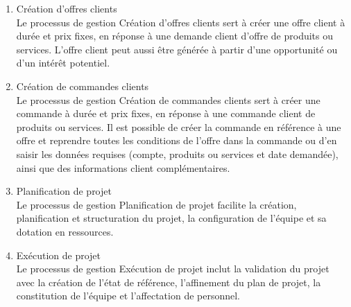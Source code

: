 \begin{enumerate}
\item Création d’offres clients \\
Le processus de gestion Création d'offres clients sert à créer une offre  client à durée et prix fixes, en réponse à une demande client d'offre de  produits ou services. L'offre client peut aussi être générée à partir d'une opportunité ou d'un intérêt potentiel. \\

\item Création de commandes clients \\
Le processus de gestion Création de commandes clients sert à créer une commande à durée et prix fixes, en réponse à une commande client de produits ou services. Il est possible de créer la commande en référence à une offre et reprendre toutes les conditions de l'offre dans la commande ou d’en saisir les données requises (compte, produits ou services et date
demandée), ainsi que des informations client complémentaires. \\

\item Planification de projet \\
Le processus de gestion Planification de projet facilite la création, planification et structuration du projet, la configuration de l'équipe et sa dotation en ressources. \\

\item Exécution de projet \\
Le processus de gestion Exécution de projet inclut la validation du projet avec la création de l'état de référence, l'affinement du plan de projet, la constitution de l'équipe et l'affectation de personnel.
\end{enumerate}



